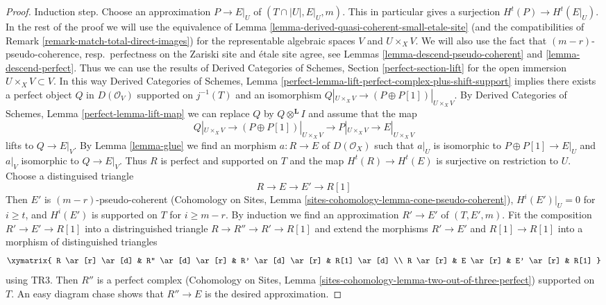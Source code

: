 \begin{proof}
\medskip\noindent
Induction step. Choose an approximation $P \to E|_U$ of
$(T \cap |U|, E|_U, m)$. This in particular gives a surjection
$H^t(P) \to H^t(E|_U)$.
In the rest of the proof we will use the equivalence of
Lemma \ref{lemma-derived-quasi-coherent-small-etale-site}
(and the compatibilities of Remark \ref{remark-match-total-direct-images})
for the representable algebraic spaces $V$ and $U \times_X V$.
We will also use the fact that $(m - r)$-pseudo-coherence,
resp.\ perfectness on the Zariski site and \'etale site agree, see
Lemmas \ref{lemma-descend-pseudo-coherent} and
\ref{lemma-descend-perfect}.
Thus we can use the results of
Derived Categories of Schemes, Section \ref{perfect-section-lift}
for the open immersion $U \times_X V \subset V$. In this way
Derived Categories of Schemes,
Lemma \ref{perfect-lemma-lift-perfect-complex-plus-shift-support}
implies there exists a perfect object $Q$ in $D(\mathcal{O}_V)$
supported on $j^{-1}(T)$ and an isomorphism
$Q|_{U \times_X V} \to (P \oplus P[1])|_{U \times_X V}$. By
Derived Categories of Schemes, Lemma \ref{perfect-lemma-lift-map}
we can replace $Q$ by $Q \otimes^\mathbf{L} I$
and assume that the map
$$
Q|_{U \times_X V} \longrightarrow
(P \oplus P[1])|_{U \times_X V} \longrightarrow
P|_{U \times_X V} \longrightarrow E|_{U \times_X V}
$$
lifts to $Q \to E|_V$. By Lemma \ref{lemma-glue}
we find an morphism $a : R \to E$ of $D(\mathcal{O}_X)$
such that $a|_U$ is isomorphic to $P \oplus P[1] \to E|_U$
and $a|_V$ isomorphic to $Q \to E|_V$.
Thus $R$ is perfect and supported on $T$
and the map $H^t(R) \to H^t(E)$ is surjective on restriction to $U$.
Choose a distinguised triangle
$$
R \to E \to E' \to R[1]
$$
Then $E'$ is $(m - r)$-pseudo-coherent
(Cohomology on Sites, Lemma \ref{sites-cohomology-lemma-cone-pseudo-coherent}),
$H^i(E')|_U = 0$ for $i \geq t$, and
$H^i(E')$ is supported on $T$ for $i \geq m - r$.
By induction we find an approximation $R' \to E'$
of $(T, E', m)$. Fit the composition $R' \to E' \to R[1]$
into a distringuished triangle $R \to R'' \to R' \to R[1]$
and extend the morphisms $R' \to E'$ and $R[1] \to R[1]$ into
a morphism of distinguished triangles
$$
\xymatrix{
R \ar[r] \ar[d] & R'' \ar[d] \ar[r] & R' \ar[d] \ar[r] & R[1] \ar[d] \\
R \ar[r] &  E \ar[r] & E' \ar[r] & R[1]
}
$$
using TR3. Then $R''$ is a perfect complex
(Cohomology on Sites, Lemma
\ref{sites-cohomology-lemma-two-out-of-three-perfect})
supported on $T$. An easy diagram chase shows that $R'' \to E$ is the desired
approximation.
\end{proof}

